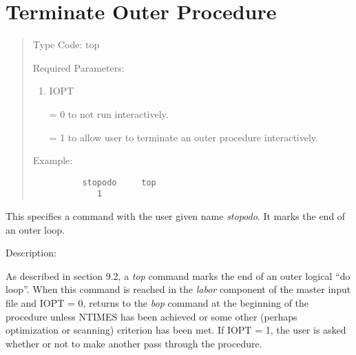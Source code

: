 \section{Terminate Outer Procedure} 
\begin{quotation}
\noindent Type Code:  top
\vspace{5mm}

\noindent Required Parameters:
\begin{enumerate}
   \item  IOPT

          = 0 to not run interactively.

          = 1 to allow user to terminate an outer procedure interactively.
\end{enumerate}
\vspace{5mm}
\noindent     Example:
\begin{verbatim}
          stopodo     top
             1
\end{verbatim}
\end{quotation}
This specifies a command with the user given name {\em stopodo}.  It marks the end of an outer loop.

\vspace{5mm}
     Description:
\vspace{2mm}

As described in section 9.2, a {\em top} command marks the end of an outer logical ``do loop''.  When this command is reached in the {\em labor} component of the master input file and IOPT = 0, \Mary returns to the {\em bop} command at the beginning of the procedure unless NTIMES has been achieved or some other (perhaps optimization or scanning) criterion has been met.  If IOPT = 1, the user is asked whether or not to make another pass through the procedure.

\newpage
